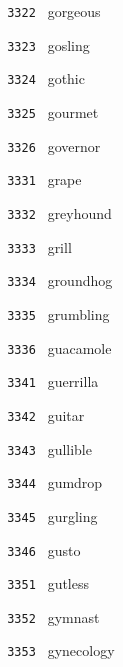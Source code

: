 \documentclass[11pt]{article}
\begin{document}
\begin{multicols}{6}
\noindent \texttt{ 3322 } \hspace{1mm} gorgeous  \par
\noindent \texttt{ 3323 } \hspace{1mm} gosling  \par
\noindent \texttt{ 3324 } \hspace{1mm} gothic  \par
\noindent \texttt{ 3325 } \hspace{1mm} gourmet  \par
\noindent \texttt{ 3326 } \hspace{1mm} governor  \par
\noindent \texttt{ 3331 } \hspace{1mm} grape  \par
\noindent \texttt{ 3332 } \hspace{1mm} greyhound  \par
\noindent \texttt{ 3333 } \hspace{1mm} grill  \par
\noindent \texttt{ 3334 } \hspace{1mm} groundhog  \par
\noindent \texttt{ 3335 } \hspace{1mm} grumbling  \par
\noindent \texttt{ 3336 } \hspace{1mm} guacamole  \par
\noindent \texttt{ 3341 } \hspace{1mm} guerrilla  \par
\noindent \texttt{ 3342 } \hspace{1mm} guitar  \par
\noindent \texttt{ 3343 } \hspace{1mm} gullible  \par
\noindent \texttt{ 3344 } \hspace{1mm} gumdrop  \par
\noindent \texttt{ 3345 } \hspace{1mm} gurgling  \par
\noindent \texttt{ 3346 } \hspace{1mm} gusto  \par
\noindent \texttt{ 3351 } \hspace{1mm} gutless  \par
\noindent \texttt{ 3352 } \hspace{1mm} gymnast  \par
\noindent \texttt{ 3353 } \hspace{1mm} gynecology  \par

\end{multicols}
\end{document}
